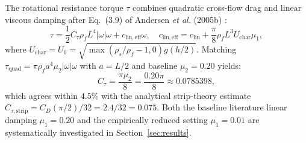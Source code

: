 \documentclass[10pt,a4paper,twocolumn]{article}
\begin{document}
The rotational resistance torque $\tau$ combines quadratic cross-flow drag and linear viscous damping after Eq.~(3.9) of Andersen \textit{et al.} (2005b) \cite{Andersen2005b}:
\begin{equation}
    \tau = \frac{1}{2} C_\tau \rho_f L^4 |\omega|\omega + c_{\mathrm{lin,eff}} \omega, \quad c_{\mathrm{lin,eff}} = c_{\mathrm{lin}} + \frac{\pi}{8}\rho_f L^3 U_{\mathrm{char}} \mu_1, \label{eq:torque}
\end{equation}
where $U_{\mathrm{char}} = U_0 = \sqrt{\max(\rho_s/\rho_f - 1, 0)g(h/2)}$. Matching $\tau_{\mathrm{quad}} = \pi \rho_f a^4 \mu_2 |\omega|\omega$ with $a = L/2$ and baseline $\mu_2 = 0.20$ yields:
\begin{equation}
    C_\tau = \frac{\pi \mu_2}{8} = \frac{0.20\pi}{8} \approx 0.0785398,
\end{equation}
which agrees within $4.5\%$ with the analytical strip-theory estimate $C_{\tau,\mathrm{strip}} = C_D(\pi/2)/32 = 2.4/32 = 0.075$. Both the baseline literature linear damping $\mu_1 = 0.20$ and the empirically reduced setting $\mu_1 = 0.01$ are systematically investigated in Section~\ref{sec:results}.
\end{document}

